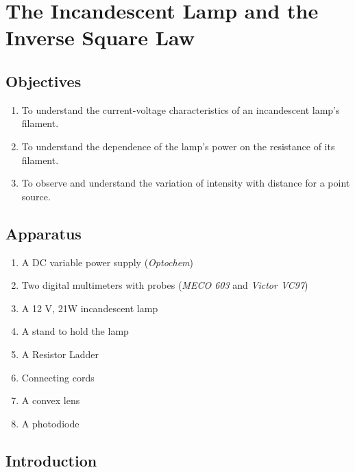 
\chapter{The Incandescent Lamp and the Inverse Square Law}

\section*{Objectives}

\begin{enumerate}
\item To understand the current-voltage characteristics of an incandescent lamp's filament.
\item To understand the dependence of the lamp's power on the resistance of its filament.
\item To observe and understand the variation of intensity with distance for a point source.
\end{enumerate}




\section*{Apparatus}

\begin{enumerate}
\item A DC variable power supply (\textit{Optochem})
\item Two digital multimeters with probes (\textit{MECO 603} and \textit{Victor VC97})
\item A 12 V, 21W incandescent lamp
\item A stand to hold the lamp
\item A Resistor Ladder
\item Connecting cords
\item A convex lens
\item A photodiode

\end{enumerate}


\section*{Introduction}



